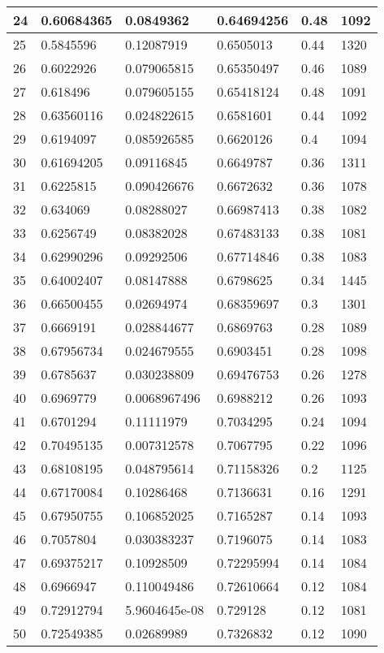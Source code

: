 \begin{longtable}{|l|l|l|l|l|l|}
24 & 0.60684365 & 0.0849362 & 0.64694256 & 0.48 & 1092 \\ \hline 
25 & 0.5845596 & 0.12087919 & 0.6505013 & 0.44 & 1320 \\ \hline 
26 & 0.6022926 & 0.079065815 & 0.65350497 & 0.46 & 1089 \\ \hline 
27 & 0.618496 & 0.079605155 & 0.65418124 & 0.48 & 1091 \\ \hline 
28 & 0.63560116 & 0.024822615 & 0.6581601 & 0.44 & 1092 \\ \hline 
29 & 0.6194097 & 0.085926585 & 0.6620126 & 0.4 & 1094 \\ \hline 
30 & 0.61694205 & 0.09116845 & 0.6649787 & 0.36 & 1311 \\ \hline 
31 & 0.6225815 & 0.090426676 & 0.6672632 & 0.36 & 1078 \\ \hline 
32 & 0.634069 & 0.08288027 & 0.66987413 & 0.38 & 1082 \\ \hline 
33 & 0.6256749 & 0.08382028 & 0.67483133 & 0.38 & 1081 \\ \hline 
34 & 0.62990296 & 0.09292506 & 0.67714846 & 0.38 & 1083 \\ \hline 
35 & 0.64002407 & 0.08147888 & 0.6798625 & 0.34 & 1445 \\ \hline 
36 & 0.66500455 & 0.02694974 & 0.68359697 & 0.3 & 1301 \\ \hline 
37 & 0.6669191 & 0.028844677 & 0.6869763 & 0.28 & 1089 \\ \hline 
38 & 0.67956734 & 0.024679555 & 0.6903451 & 0.28 & 1098 \\ \hline 
39 & 0.6785637 & 0.030238809 & 0.69476753 & 0.26 & 1278 \\ \hline 
40 & 0.6969779 & 0.0068967496 & 0.6988212 & 0.26 & 1093 \\ \hline 
41 & 0.6701294 & 0.11111979 & 0.7034295 & 0.24 & 1094 \\ \hline 
42 & 0.70495135 & 0.007312578 & 0.7067795 & 0.22 & 1096 \\ \hline 
43 & 0.68108195 & 0.048795614 & 0.71158326 & 0.2 & 1125 \\ \hline 
44 & 0.67170084 & 0.10286468 & 0.7136631 & 0.16 & 1291 \\ \hline 
45 & 0.67950755 & 0.106852025 & 0.7165287 & 0.14 & 1093 \\ \hline 
46 & 0.7057804 & 0.030383237 & 0.7196075 & 0.14 & 1083 \\ \hline 
47 & 0.69375217 & 0.10928509 & 0.72295994 & 0.14 & 1084 \\ \hline 
48 & 0.6966947 & 0.110049486 & 0.72610664 & 0.12 & 1084 \\ \hline 
49 & 0.72912794 & 5.9604645e-08 & 0.729128 & 0.12 & 1081 \\ \hline 
50 & 0.72549385 & 0.02689989 & 0.7326832 & 0.12 & 1090 \\ \hline 
\end{longtable}